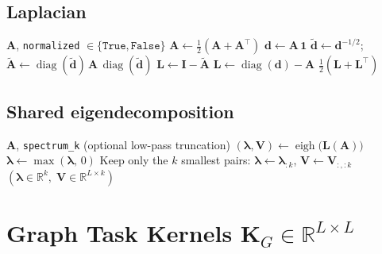 \documentclass[11pt]{article}
\begin{document}
\subsection{Laplacian}

\begin{algorithm}[H]
\caption{Graph Laplacian (normalized or unnormalized)}
\begin{algorithmic}[1]
\Require $\mathbf{A}$, \texttt{normalized} $\in \{\texttt{True}, \texttt{False}\}$
\State $\mathbf{A} \gets \tfrac{1}{2}(\mathbf{A} + \mathbf{A}^\top)$ 
\State $\mathbf{d} \gets \mathbf{A}\,\mathbf{1}$ 
    \State $\tilde{\mathbf{d}} \gets \mathbf{d}^{-1/2}$;\quad
           $\tilde{\mathbf{A}} \gets \operatorname{diag}(\tilde{\mathbf{d}})\,\mathbf{A}\,\operatorname{diag}(\tilde{\mathbf{d}})$
    \State $\mathbf{L} \gets \mathbf{I} - \tilde{\mathbf{A}}$ 
\Else
    \State $\mathbf{L} \gets \operatorname{diag}(\mathbf{d}) - \mathbf{A}$
\EndIf
\State \Return $\tfrac{1}{2}(\mathbf{L}+\mathbf{L}^\top)$ 
\end{algorithmic}
\end{algorithm}

\subsection{Shared eigendecomposition}

\begin{algorithm}[H]
\caption{Laplacian eigendecomposition (used by all graph kernels)}
\begin{algorithmic}[1]
\Require $\mathbf{A}$, \texttt{spectrum\_k} (optional low-pass truncation)
\State $(\bm{\lambda}, \mathbf{V}) \gets \operatorname{eigh}\!\bigl(\mathbf{L}(\mathbf{A})\bigr)$ 
\State $\bm{\lambda} \gets \max(\bm{\lambda},\, 0)$
    \State Keep only the $k$ smallest pairs: $\bm{\lambda} \gets \bm{\lambda}_{:k}$,\;
           $\mathbf{V} \gets \mathbf{V}_{:,:k}$ 
\EndIf
\State \Return $(\bm{\lambda} \in \mathbb{R}^k,\; \mathbf{V} \in \mathbb{R}^{L\times k})$
\end{algorithmic}
\end{algorithm}

\section{Graph Task Kernels $\mathbf{K}_G \in \mathbb{R}^{L\times L}$}
\end{document}
